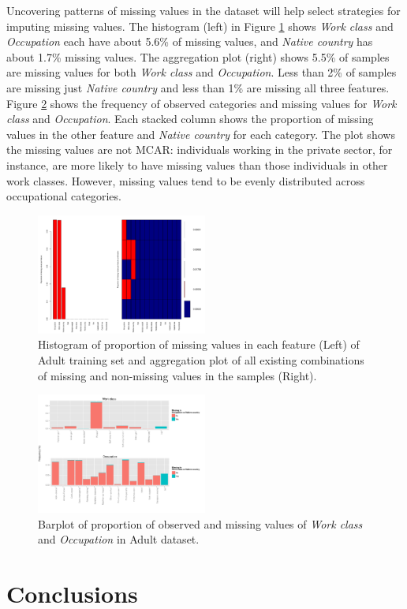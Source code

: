 \documentclass[10pt,twocolumn,letterpaper]{article}
\begin{document}
Uncovering patterns of missing values in the dataset will help select strategies for imputing missing values. The histogram (left) in Figure \ref{fig:proportion-missing} shows \textit{Work class} and \textit{Occupation} each have about 5.6\% of missing values, and \textit{Native country} has about 1.7\% missing values. The aggregation plot (right) shows 5.5\% of samples are missing values for both \textit{Work class} and \textit{Occupation}. Less than 2\% of samples are missing just \textit{Native country} and less than 1\% are missing all three features.\\

Figure \ref{fig:barplot-missing} shows the frequency of observed categories and missing values for \textit{Work class} and \textit{Occupation}. Each stacked column shows the proportion of missing values in the other feature and \textit{Native country} for each category. The plot shows the missing values are not MCAR: individuals working in the private sector, for instance, are more likely to have missing values than those individuals in other work classes. However, missing values tend to be evenly distributed across occupational categories. 

\begin{figure}[htbp] 
   \centering
   \includegraphics[width=0.5\textwidth]{./figure/proportion-missing.pdf}
   \caption{Histogram of proportion of missing values in each feature (Left) of Adult training set and aggregation plot of all existing combinations of missing and non-missing values in the samples (Right).}
   \label{fig:proportion-missing}
\end{figure}

\begin{figure}[htbp] 
   \centering
   \includegraphics[width=0.5\textwidth]{./figure/barplot-missing.pdf}
   \caption{Barplot of proportion of observed and missing values of \textit{Work class} and \textit{Occupation} in Adult dataset.}
   \label{fig:barplot-missing}
\end{figure}

\section{Conclusions} \label{section:Con}


{\small


}
\end{document}
